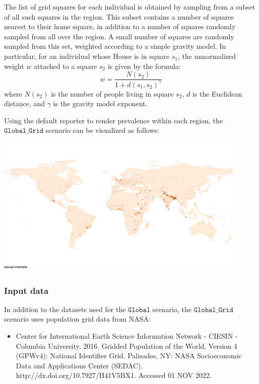 \documentclass[10pt,letterpaper]{article}
\begin{document}
The list of grid squares for each individual is obtained by sampling from a subset of all such squares in the region. This subset contains a number of squares nearest to their home square, in addition to a number of squares randomly sampled from all over the region. A small number of squares are randomly sampled from this set, weighted according to a simple gravity model. In particular, for an individual whose House is in square $s_1$, the unnormalized weight $w$ attached to a square $s_2$ is given by the formula:
\begin{equation}
w = \frac{N(s_2)}{1 + d(s_1, s_2)^\gamma} \nonumber
\end{equation}
where $N(s_2)$ is the number of people living in square $s_2$, $d$ is the Euclidean distance, and $\gamma$ is the gravity model exponent.

Using the default reporter to render prevalence within each region, the $\texttt{Global{\_}Grid}$ scenario can be visualized as follows:

\begin{center}
\includegraphics[width=0.9\textwidth]{heterogeneous}
\end{center}

\subsubsection*{Input data}

\noindent In addition to the datasets used for the $\texttt{Global}$ scenario, the $\texttt{Global{\_}Grid}$ scenario uses population grid data from NASA:

\begin{itemize}
\item[] Center for International Earth Science Information Network - CIESIN - Columbia University. 2016. Gridded Population of the World, Version 4 (GPWv4): National Identifier Grid. Palisades, NY: NASA Socioeconomic Data and Applications Center (SEDAC). http://dx.doi.org/10.7927/H41V5BX1. Accessed 01 NOV 2022.
\end{itemize}
\end{document}
